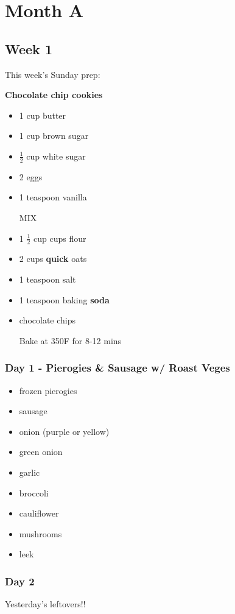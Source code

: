 \documentclass[11pt, a4paper]{article}
\begin{document}
\pagebreak
\section{Month A}

\subsection{Week 1}

This week's Sunday prep:
\par
\vspace{1pc}
\noindent\textbf{Chocolate chip cookies}
\par

\begin{itemize}
\item 1 cup butter
\item 1 cup brown sugar
\item $\frac{1}{2}$ cup white sugar
\item 2 eggs
\item 1 teaspoon vanilla
\par
MIX
\item 1 $\frac{1}{2}$ cup cups flour
\item 2 cups \textbf{quick} oats
\item 1 teaspoon salt
\item 1 teaspoon baking \textbf{soda}
\item chocolate chips
\par
Bake at 350F for 8-12 mins
\end{itemize}

\subsubsection{Day 1 - Pierogies \& Sausage w/ Roast Veges}
\vspace{1pc}
\begin{itemize}
\item frozen pierogies
\item sausage
\item onion (purple or yellow)
\item green onion
\item garlic
\item broccoli
\item cauliflower
\item mushrooms
\item leek
\end{itemize}

\subsubsection{Day 2}
\vspace{1pc}
Yesterday's leftovers!!
\vspace{2pc}
\end{document}
